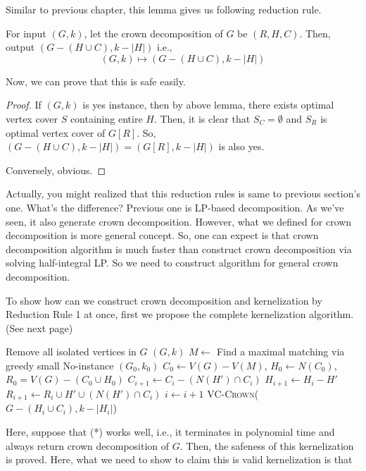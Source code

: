 \documentclass[12pt, a4paper, openany, twoside]{book}
\theoremstyle{definition}
\theoremstyle{remark}
\theoremstyle{plain}
\numberwithin{equation}{section}
\begin{document}
Similar to previous chapter, this lemma gives us following reduction rule. 

\begin{tcolorbox}[colback=yellow!10!white,colframe=blue!75!black,title=Reduction Rule 1]

For input $(G, k)$, let the crown decomposition of $G$ be $(R, H, C)$. Then, output $(G - (H \cup C), k - |H|)$
i.e., 
\[(G, k) \mapsto (G - (H \cup C), k - |H|)\]

\end{tcolorbox}
Now, we can prove that this is safe easily. 

\begin{proof}
    
If $(G, k)$ is yes instance, then by above lemma, there exists optimal vertex cover $S$ containing entire $H$. 
Then, it is clear that $S_C = \emptyset$ and $S_R$ is optimal vertex cover of $G[R]$. So, $(G - (H \cup C), k - |H|) = (G[R], k - |H|)$ is also yes. 

Conversely, obvious. 

\end{proof}

Actually, you might realized that this reduction rules is same to previous section's one. 
What's the difference? Previous one is LP-based decomposition. As we've seen, it also generate crown decomposition. 
However, what we defined for crown decomposition is more general concept. So, one can expect is that 
crown decomposition algorithm is much faster than construct crown decomposition via solving half-integral LP. 
So we need to construct algorithm for general crown decomposition. 

To show how can we construct crown decomposition and kernelization by Reduction Rule 1 at once, 
first we propose the complete kernelization algorithm. (See next page)

\newpage 

\begin{algorithm}
    
\caption{$4k + 1$ Kernelization for \textsc{Vertex Cover} using crown decomposition}
\begin{algorithmic}[1]
\State Remove all isolated vertices in $G$ 
 \Return $(G, k)$  
\Else
\State $M \gets$ Find a maximal matching via greedy 
 \Return small No-instance $(G_0, k_0)$
\State $C_0 \gets V(G) - V(M)$,  $ H_0 \gets N(C_0)$, $R_0 = V(G) - (C_0 \cup H_0)$
 \Comment{(*)}
\State $C_{i+1} \gets C_i - (N(H') \cap C_i)$
\State $H_{i+1} \gets H_i - H'$
\State $R_{i+1} \gets R_i \cup H' \cup (N(H') \cap C_i)$
\State $i \gets i + 1$
\EndWhile
\State \Return \textsc{VC-Crown}($G-(H_i \cup C_i), k - |H_i|$)
\EndIf
\EndIf
\EndProcedure
\end{algorithmic}
\end{algorithm}
Here, suppose that (*) works well, i.e., it terminates in polynomial time and always return crown decomposition of $G$. 
Then, the safeness of this kernelization is proved. Here, what we need to show to claim this is valid kernelization is that 
\end{document}
